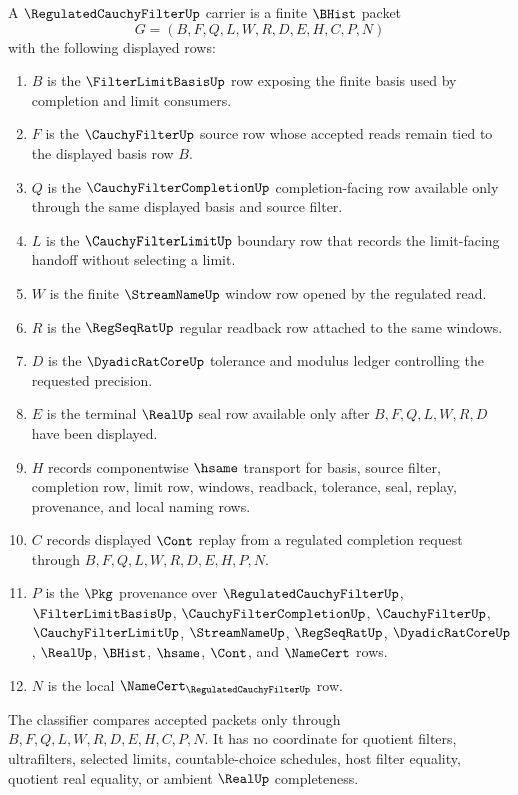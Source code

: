 \begin{definition}
\label{def:regulated-cauchy-filter-carrier}
A $\RegulatedCauchyFilterUp$ carrier is a finite $\BHist$ packet
$$
G=(B,F,Q,L,W,R,D,E,H,C,P,N)
$$
with the following displayed rows:
\begin{enumerate}
\item $B$ is the $\FilterLimitBasisUp$ row exposing the finite basis used by completion and limit consumers.
\item $F$ is the $\CauchyFilterUp$ source row whose accepted reads remain tied to the displayed basis row $B$.
\item $Q$ is the $\CauchyFilterCompletionUp$ completion-facing row available only through the same displayed basis and source filter.
\item $L$ is the $\CauchyFilterLimitUp$ boundary row that records the limit-facing handoff without selecting a limit.
\item $W$ is the finite $\StreamNameUp$ window row opened by the regulated read.
\item $R$ is the $\RegSeqRatUp$ regular readback row attached to the same windows.
\item $D$ is the $\DyadicRatCoreUp$ tolerance and modulus ledger controlling the requested precision.
\item $E$ is the terminal $\RealUp$ seal row available only after $B,F,Q,L,W,R,D$ have been displayed.
\item $H$ records componentwise $\hsame$ transport for basis, source filter, completion row, limit row, windows, readback, tolerance, seal, replay, provenance, and local naming rows.
\item $C$ records displayed $\Cont$ replay from a regulated completion request through $B,F,Q,L,W,R,D,E,H,P,N$.
\item $P$ is the $\Pkg$ provenance over $\RegulatedCauchyFilterUp$, $\FilterLimitBasisUp$, $\CauchyFilterCompletionUp$, $\CauchyFilterUp$, $\CauchyFilterLimitUp$, $\StreamNameUp$, $\RegSeqRatUp$, $\DyadicRatCoreUp$, $\RealUp$, $\BHist$, $\hsame$, $\Cont$, and $\NameCert$ rows.
\item $N$ is the local $\NameCert_{\RegulatedCauchyFilterUp}$ row.
\end{enumerate}
The classifier compares accepted packets only through $B,F,Q,L,W,R,D,E,H,C,P,N$. It has no coordinate for quotient filters, ultrafilters, selected limits, countable-choice schedules, host filter equality, quotient real equality, or ambient $\RealUp$ completeness.
\end{definition}

